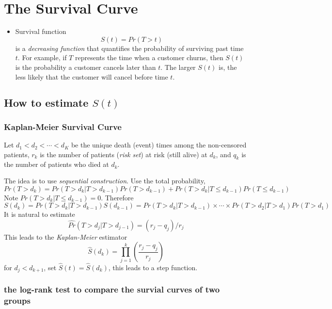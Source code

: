 \documentclass[
  letterpaper,
  DIV=11,
  numbers=noendperiod]{scrreprt}
\providecommand{\tightlist}{%
  \setlength{\itemsep}{0pt}\setlength{\parskip}{0pt}}\usepackage{longtable,booktabs,array}
\begin{document}
\section{The Survival Curve}\label{the-survival-curve}

\begin{itemize}
\tightlist
\item
  Survival function \[
  S(t) = Pr(T>t)
  \] is a \emph{decreasing function} that quantifies the probability of
  surviving past time \(t\). For example, if \(T\) represents the time
  when a customer churns, then \(S(t)\) is the probability a customer
  cancels later than \(t\). The larger \(S(t)\) is, the less likely that
  the customer will cancel before time \(t\).
\end{itemize}

\subsection{\texorpdfstring{How to estimate
\(S(t)\)}{How to estimate S(t)}}\label{how-to-estimate-st}

\subsubsection{Kaplan-Meier Survival
Curve}\label{kaplan-meier-survival-curve}

Let \(d_1<d_2<\cdots< d_K\) be the unique death (event) times among the
non-censored patients, \(r_k\) is the number of patients (\emph{risk
set}) at risk (still alive) at \(d_k\), and \(q_k\) is the number of
patients who died at \(d_k\).

The idea is to use \emph{sequential construction}. Use the total
probability, \[
Pr(T>d_k) =Pr(T>d_k|T>d_{k-1})Pr(T>d_{k-1})+Pr(T>d_k|T\le d_{k-1}) Pr(T\le d_{k-1})
\] Note \(Pr(T>d_k|T\le d_{k-1}) =0\). Therefore \[
S(d_k) = Pr(T>d_k|T>d_{k-1})S(d_{k-1}) = Pr(T>d_k|T>d_{k-1})\times \cdots \times Pr(T>d_2|T>d_{1})Pr(T>d_1)
\] It is natural to estimate \[
\hat{Pr}(T>d_j|T>d_{j-1})=(r_j-q_j)/r_j
\] This leads to the \emph{Kaplan-Meier} estimator \[
\hat{S}(d_k) =\prod_{j=1}^k\left(\frac{r_j-q_j}{r_j} \right)
\] for \(d_j<d_{k+1}\), set \(\hat{S}(t) =\hat{S}(d_k)\), this leads to
a step function.

\subsubsection{the log-rank test to compare the survial curves of two
groups}\label{the-log-rank-test-to-compare-the-survial-curves-of-two-groups}
\end{document}
